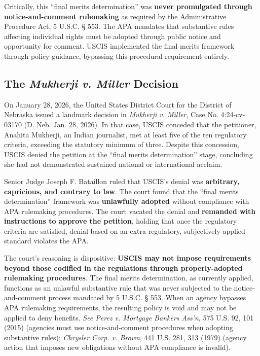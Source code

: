 Critically, this ``final merits determination'' was \textbf{never promulgated through notice-and-comment rulemaking} as required by the Administrative Procedure Act, 5 U.S.C. § 553. The APA mandates that substantive rules affecting individual rights must be adopted through public notice and opportunity for comment. USCIS implemented the final merits framework through policy guidance, bypassing this procedural requirement entirely.

\subsection{The \textit{Mukherji v. Miller} Decision}

On January 28, 2026, the United States District Court for the District of Nebraska issued a landmark decision in \textit{Mukherji v. Miller}, Case No. 4:24-cv-03170 (D. Neb. Jan. 28, 2026). In that case, USCIS conceded that the petitioner, Anahita Mukherji, an Indian journalist, met at least five of the ten regulatory criteria, exceeding the statutory minimum of three. Despite this concession, USCIS denied the petition at the ``final merits determination'' stage, concluding she had not demonstrated sustained national or international acclaim.

Senior Judge Joseph F. Bataillon ruled that USCIS's denial was \textbf{arbitrary, capricious, and contrary to law}. The court found that the ``final merits determination'' framework was \textbf{unlawfully adopted} without compliance with APA rulemaking procedures. The court vacated the denial and \textbf{remanded with instructions to approve the petition}, holding that once the regulatory criteria are satisfied, denial based on an extra-regulatory, subjectively-applied standard violates the APA.

The court's reasoning is dispositive: \textbf{USCIS may not impose requirements beyond those codified in the regulations through properly-adopted rulemaking procedures}. The final merits determination, as currently applied, functions as an unlawful substantive rule that was never subjected to the notice-and-comment process mandated by 5 U.S.C. § 553. When an agency bypasses APA rulemaking requirements, the resulting policy is void and may not be applied to deny benefits. \textit{See Perez v. Mortgage Bankers Ass'n}, 575 U.S. 92, 101 (2015) (agencies must use notice-and-comment procedures when adopting substantive rules); \textit{Chrysler Corp. v. Brown}, 441 U.S. 281, 313 (1979) (agency action that imposes new obligations without APA compliance is invalid).

